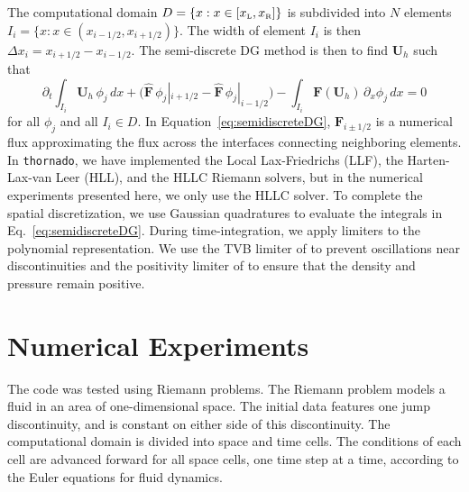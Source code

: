 \documentclass[10pt]{article}
\newcommand{\thornado}{\texttt{thornado}}
\begin{document}
The computational domain $D=\{x:x\in[x_{\mbox{\tiny L}},x_{\mbox{\tiny R}}]\}$ is subdivided into $N$ elements $I_{i}=\{x:x\in(x_{i-1/2},x_{i+1/2})\}$.  
The width of element $I_{i}$ is then $\Delta x_{i}=x_{i+1/2}-x_{i-1/2}$.  
The semi-discrete DG method is then to find $\boldsymbol{U}_{h}$ such that
\begin{equation}
  \partial_{t}\int_{I_{i}}\boldsymbol{U}_{h}\,\phi_{j}\,dx
  +\big(\widehat{\boldsymbol{F}}\,\phi_{j}|_{i+1/2}-\widehat{\boldsymbol{F}}\,\phi_{j}|_{i-1/2}\big)
  -\int_{I_{i}}\boldsymbol{F}(\boldsymbol{U}_{h})\,\partial_{x}\phi_{j}\,dx=0
  \label{eq:semidiscreteDG}
\end{equation}
for all $\phi_{j}$ and all $I_{i}\in D$.  
In Equation~\eqref{eq:semidiscreteDG}, $\widehat{\boldsymbol{F}}_{i\pm1/2}$ is a numerical flux approximating the flux across the interfaces connecting neighboring elements.  
In \thornado, we have implemented the Local Lax-Friedrichs (LLF), the Harten-Lax-van Leer (HLL), and the HLLC Riemann solvers, but in the numerical experiments presented here, we only use the HLLC solver.  
To complete the spatial discretization, we use Gaussian quadratures to evaluate the integrals in Eq.~\eqref{eq:semidiscreteDG}.  
During time-integration, we apply limiters to the polynomial representation.  
We use the TVB limiter of \citet{} to prevent oscillations near discontinuities and the positivity limiter of \citet{ZhangShu2010} to ensure that the density and pressure remain positive.  

\section{Numerical Experiments}

The code was tested using Riemann problems. The Riemann problem models a fluid in an area of one-dimensional space. The initial data features one jump discontinuity, and is constant on either side of this discontinuity. The computational domain is divided into space and time cells. The conditions of each cell are advanced forward for all space cells, one time step at a time, according to the Euler equations for fluid dynamics. \citep{Leveque2002}

\end{document}
